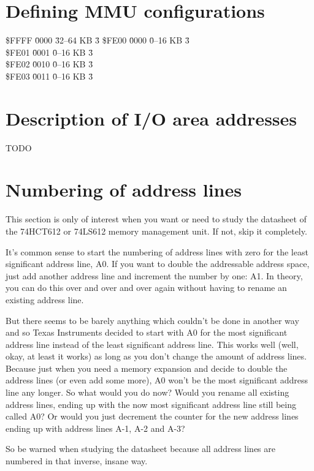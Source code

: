 \section{Defining MMU configurations}
\begin{tabbing}
\$FFFF \= 0000 \=32--64 KB \= 3 \kill %
\$FE00 \= 0000 \= 0--16 KB \= 3 \\
\$FE01 \= 0001 \= 0--16 KB \= 3 \\
\$FE02 \= 0010 \= 0--16 KB \= 3 \\
\$FE03 \= 0011 \= 0--16 KB \= 3 \\
\end{tabbing}

\section{Description of I/O area addresses}
TODO

\section{Numbering of address lines}
This section is only of interest when you want or need to study
the datasheet of the 74HCT612 or 74LS612 memory management unit.
If not, skip it completely.

It's common sense to start the numbering of address lines with
zero for the least significant address line, A0. If you want to
double the addressable address space, just add another address
line and increment the number by one: A1. In theory, you can do
this over and over and over again without having to rename an
existing address line.

But there seems to be barely anything which couldn't be done in
another way and so Texas Instruments decided to start with A0
for the most significant address line instead of the least
significant address line. This works well (well, okay, at least
it works) as long as you don't change the amount of address
lines. Because just when you need a memory expansion and decide
to double the address lines (or even add some more), A0 won't be
the most significant address line any longer. So what would you
do now? Would you rename all existing address lines, ending up
with the now most significant address line still being called
A0? Or would you just decrement the counter for the new address
lines ending up with address lines A-1, A-2 and A-3?

So be warned when studying the datasheet because all address
lines are numbered in that inverse, insane way.


